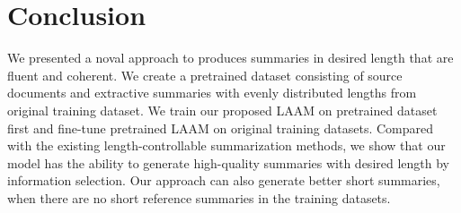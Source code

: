 \section{Conclusion}
\label{sec:conclude}
We presented a noval approach to produces 
summaries in desired length that are fluent and coherent. 
We create a pretrained dataset consisting of source documents and 
extractive summaries with evenly distributed lengths from original training dataset.
We train our proposed LAAM on pretrained dataset first and
fine-tune pretrained LAAM on original training datasets.
Compared with the existing
length-controllable summarization methods, we show that our model has the ability to generate high-quality summaries with desired length by information selection. Our approach can also generate better short summaries,
when there are no short reference summaries in the training datasets.
